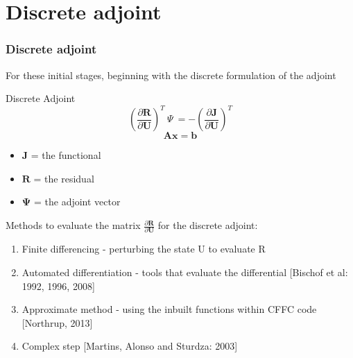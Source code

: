 \documentclass{beamer}
\begin{document}

\section{Discrete adjoint}
\begin{frame}
\frametitle{Discrete adjoint}
\scriptsize
\begin{minipage}[t][1\textheight]{1\textwidth}
\vspace{-10pt}
For these initial stages, beginning with the discrete formulation of the adjoint

\begin{exampleblock}{Discrete Adjoint}
\vspace{-8pt}
\[\left( \frac{\partial{\mathbf{R}}}{\partial{\mathbf{U}}} \right)^T ~\Psi~ = -\left( \frac{\partial{\mathbf{J}}}{\partial{\mathbf{U}}} \right)^T\]
\vspace{-10pt}
\[\mathbf{Ax} = \mathbf{b}\] %
\begin{itemize}
\tiny
\item \textbf{$\mathbf{J}$} = the functional
\item \textbf{$\mathbf{R}$} =  the residual
\item \textbf{$\mathbf{\Psi}$} = the adjoint vector
\end{itemize}
\end{exampleblock}

\vspace{0pt}
Methods to evaluate the matrix $\frac{\partial{\mathbf{R}}}{\partial{\mathbf{U}}} $  for the discrete adjoint:
\vspace{2pt}
\begin{enumerate}[1.]
\tiny
\item Finite differencing - perturbing the state U to evaluate R 
\item Automated differentiation - tools that evaluate the differential [Bischof et al: 1992, 1996, 2008]
\item Approximate method  - using the inbuilt functions within CFFC code [Northrup, 2013]
\item Complex step [Martins, Alonso and Sturdza: 2003]
\end{enumerate}
\end{minipage}


\end{frame}
\end{document}

